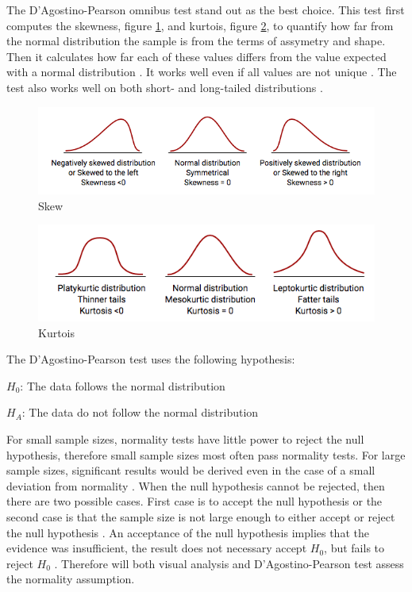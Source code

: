 The D'Agostino-Pearson omnibus test stand out as the best choice. This test first computes the skewness, figure \ref{fig:skew}, and kurtois, figure \ref{fig:kurtois}, to quantify how far from the normal distribution the sample is from the terms of assymetry and shape. Then it calculates how far each of these values differs from the value expected with a normal distribution \citep{Pearson2006}. It works well even if all values are not unique \citep{Motulsky2013}. The test also works well on both short- and long-tailed distributions \citep{Yap2011}. \newline  %

\begin{figure}[h!]
	\centering
	\includegraphics[width=0.7\linewidth]{"fig/skew"}
	\caption{Skew \citep{MedCalcSoftwarebvba2017}}
	\label{fig:skew}
\end{figure}

\begin{figure}[h!]
	\centering
	\includegraphics[width=0.7\linewidth]{fig/kurtois}
	\caption{Kurtois \citep{MedCalcSoftwarebvba2017}}
	\label{fig:kurtois}
\end{figure}


The D'Agostino-Pearson test uses the following hypothesis:\newline

\centerline{$H_{0}$: The data follows the normal distribution} 
\centerline{$H_{A}$: The data do not follow the normal distribution}

For small sample sizes, normality tests have little power to reject the null hypothesis, therefore small sample sizes most often pass normality tests. For large sample sizes, significant results would be derived even in the case of a small deviation from normality \citep{Pearson2006}. When the null hypothesis cannot be rejected, then there are two possible cases. First case is to accept the null hypothesis or the second case is that the sample size is not large enough to either accept or reject the null hypothesis \citep{ThePennsylvaniaStateUniversity2017}. An acceptance of the null hypothesis implies that the evidence was insufficient, the result does not necessary accept $H_{0}$, but fails to reject $H_{0}$ \citep{Walpole2012}.  Therefore will both visual analysis and D'Agostino-Pearson test assess the normality assumption. 

